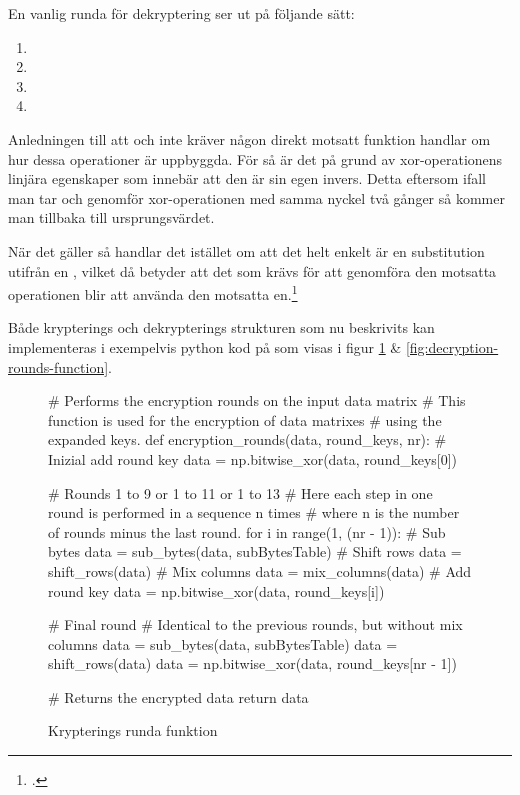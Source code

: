En vanlig runda för dekryptering ser ut på följande sätt:

\begin{enumerate}
    \item {}
    \item {}
    \item {}
    \item {}
\end{enumerate}

Anledningen till att  och  inte kräver någon direkt motsatt funktion handlar om hur dessa operationer
är uppbyggda. För  så är det på grund av \gls{xor}-operationens linjära egenskaper som innebär att den är sin egen invers.
Detta eftersom ifall man tar och genomför \gls{xor}-operationen med samma nyckel två gånger så kommer man tillbaka till ursprungsvärdet.

När det gäller 
så handlar det istället om att det helt enkelt är en substitution utifrån en , vilket då betyder att det som krävs för att genomföra den motsatta operationen
blir att använda den motsatta en.\footcite{daemen1999aes}

Både krypterings och dekrypterings strukturen som nu beskrivits kan implementeras i exempelvis \gls{python} kod på som visas i figur \ref{fig:encryption-rounds-function} \& \ref{fig:decryption-rounds-function}.

\begin{figure}[H]
    \centering
    \begin{python}
    # Performs the encryption rounds on the input data matrix
    # This function is used for the encryption of data matrixes
    # using the expanded keys.
    def encryption_rounds(data, round_keys, nr):
        # Inizial add round key
        data = np.bitwise_xor(data, round_keys[0])

        # Rounds 1 to 9 or 1 to 11 or 1 to 13
        # Here each step in one round is performed in a sequence n times
        # where n is the number of rounds minus the last round.
        for i in range(1, (nr - 1)):
            # Sub bytes
            data = sub_bytes(data, subBytesTable)
            # Shift rows
            data = shift_rows(data)
            # Mix columns
            data = mix_columns(data)
            # Add round key
            data = np.bitwise_xor(data, round_keys[i])

        # Final round
        # Identical to the previous rounds, but without mix columns
        data = sub_bytes(data, subBytesTable)
        data = shift_rows(data)
        data = np.bitwise_xor(data, round_keys[nr - 1])

        # Returns the encrypted data
        return data

    \end{python}
    \caption{Krypterings runda funktion}
    \label{fig:encryption-rounds-function}
\end{figure}

